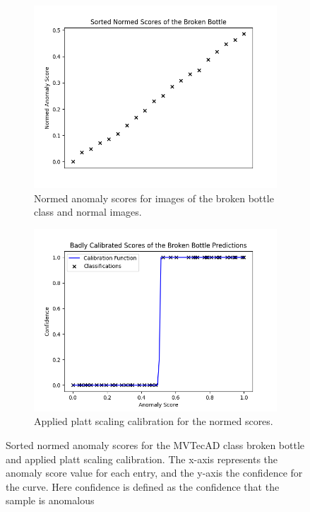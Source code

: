 \begin{figure}[htbp]
    \centering
    \begin{subfigure}[b]{0.4\textwidth}
        \includegraphics[width=\textwidth]{figures/anomaly_scores_sorted.png}
        \caption{Normed anomaly scores for images of the broken bottle class and normal images.}
        \label{fig:scoresNormed}
    \end{subfigure}
    \hfill
    \begin{subfigure}[b]{0.4\textwidth}
        \includegraphics[width=\textwidth]{figures/anomaly_calibration_step.png}
        \caption{Applied platt scaling calibration for the normed scores.}
        \label{fig:platt}
    \end{subfigure}
    \caption{Sorted normed anomaly scores for the MVTecAD \cite{MVTEC_Bergmann_2021} class broken bottle and applied platt scaling calibration. The x-axis represents 
            the anomaly score value for each entry, and the y-axis the confidence for the curve. Here confidence is defined as the confidence that the sample is anomalous}
    \label{fig:badCal}
\end{figure}

